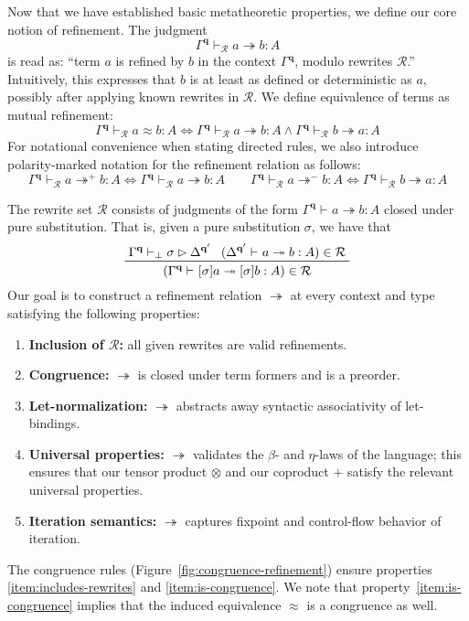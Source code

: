 \documentclass[acmsmall,screen,review]{acmart}
\newcommand{\mc}[1]{\ensuremath{\mathcal{#1}}}
\newcommand{\mb}[1]{\ensuremath{\mathbf{#1}}}
\newcommand{\issubst}[4]{#1 \vdash_{#2} #3 \rhd #4}
\newcommand{\teqv}{\approx}
\newcommand{\tref}{\twoheadrightarrow}
\newcommand{\tmle}[5]{#1 \vdash_{#2} #3 \tref #4 : {#5}}
\newcommand{\tmlep}[6]{#1 \vdash_{#2} #3 \tref^{#6} #4 : {#5}}
\newcommand{\tmeq}[5]{#1 \vdash_{#2} #3 \teqv #4 : {#5}}
\begin{document}
Now that we have established basic metatheoretic properties, we define our core notion of
refinement. The judgment
\begin{equation*}
  \tmle{\Gamma^{\mb{q}}}{\mc{R}}{a}{b}{A}
\end{equation*}
is read as: ``term $a$ is refined by $b$ in the context $\Gamma^{\mb{q}}$, modulo rewrites
$\mc{R}$.'' Intuitively, this expresses that $b$ is at least as defined or deterministic as $a$,
possibly after applying known rewrites in $\mc{R}$. We define equivalence of terms as mutual
refinement:
\begin{equation}
  \tmeq{\Gamma^{\mb{q}}}{\mc{R}}{a}{b}{A}
  \iff \tmle{\Gamma^{\mb{q}}}{\mc{R}}{a}{b}{A} 
  \land \tmle{\Gamma^{\mb{q}}}{\mc{R}}{b}{a}{A}
\end{equation}
For notational convenience when stating directed rules, we also introduce polarity-marked notation
for the refinement relation as follows:
\begin{equation*}
  \tmlep{\Gamma^{\mb{q}}}{\mc{R}}{a}{b}{A}{+} \iff \tmle{\Gamma^{\mb{q}}}{\mc{R}}{a}{b}{A} \qquad
  \tmlep{\Gamma^{\mb{q}}}{\mc{R}}{a}{b}{A}{-} \iff \tmle{\Gamma^{\mb{q}}}{\mc{R}}{b}{a}{A}
\end{equation*}

The rewrite set $\mc{R}$ consists of judgments of the form $\tmle{\Gamma^{\mb{q}}}{}{a}{b}{A}$
closed under pure substitution. That is, given a pure substitution $\sigma$, we have that
\begin{equation*}
  \prftree[r]{}
    {\issubst{\Gamma^{\mb{q}}}{\bot}{\sigma}{\Delta^{\mb{q}'}}}
    {(\tmle{\Delta^{\mb{q}'}}{}{a}{b}{A}) \in \mc{R}}
    {(\tmle{\Gamma^{\mb{q}}}{}{[\sigma]a}{[\sigma]b}{A}) \in \mc{R}} 
\end{equation*}
Our goal is to construct a refinement relation $\tref$ at every context and type satisfying the
following properties: 
\begin{enumerate}
  \item \textbf{Inclusion of $\mc{R}$:} all given rewrites are valid refinements.
  \label{item:includes-rewrites}
  \item \textbf{Congruence:} $\tref$ is closed under term formers and is a preorder.
  \label{item:is-congruence}
  \item \textbf{Let-normalization:} $\tref$ abstracts away syntactic associativity of let-bindings.
  \label{item:abstracts-syntax}
  \item \textbf{Universal properties:} $\tref$ validates the $\beta$- and $\eta$-laws of the
  language; this ensures that our tensor product $\otimes$ and our coproduct $+$ satisfy the
  relevant universal properties.
  \label{item:does-computation}
  \item \textbf{Iteration semantics:} $\tref$ captures fixpoint and control-flow behavior of
  iteration.
  \label{item:does-iteration}
\end{enumerate}
The congruence rules (Figure~\ref{fig:congruence-refinement}) ensure properties
\ref{item:includes-rewrites} and \ref{item:is-congruence}. We note that
property~\ref{item:is-congruence} implies that the induced equivalence $\approx$ is a
congruence as well.
\end{document}

